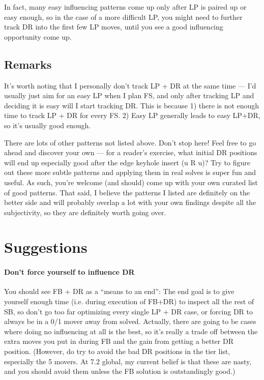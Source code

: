 \documentclass[12pt,letter]{article}
\newcommand{\p}{\textquotesingle}
\newcommand{\ps}{\p\,\,}
\begin{document}
In fact, many easy influencing patterns come up only after LP is paired up or easy enough, so in the case of a more difficult LP, you might need to further track DR into the first few LP moves, until you see a good influencing opportunity come up.


\subsection{Remarks}
It's worth noting that I personally don't track LP + DR at the same time --- I’d usually just aim for an easy LP when I plan FS, and only after tracking LP and deciding it is easy will I start tracking DR. This is because 1) there is not enough time to track LP + DR for every FS. 2) Easy LP generally leads to easy LP+DR, so it's usually good enough.

There are lots of other patterns not listed above. Don't stop here! Feel free to go ahead and discover your own --- for  a reader’s exercise, what initial DR positions will end up especially good after the edge keyhole insert (u\ps R u)? Try to figure out these more subtle patterns and applying them in real solves is super fun and useful. As such, you're welcome (and should) come up with your own curated list of good patterns. That said, I believe the patterns I listed are definitely on the better side and will probably overlap a lot with your own findings despite all the subjectivity, so they are definitely worth going over.

\section{Suggestions}

\paragraph{Don’t force yourself to influence DR}

You should see FB + DR as a ``means to an end'': The end goal is to give yourself enough time (i.e. during execution of FB+DR) to inspect all the rest of SB, so don’t go too far optimizing every single LP + DR case, or forcing DR to always be in a 0/1 mover away from solved.
Actually, there are going to be cases where doing no influencing at all is the best, so it’s really a trade off between the extra moves you put in during FB and the gain from getting a better DR position. (However, do try to avoid the bad DR positions in the tier list, especially the 5 movers. At 7.2 global, my current belief is that these are nasty, and you should avoid them unless the FB solution is outstandingly good.)
\end{document}
